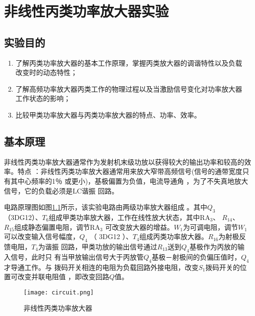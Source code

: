 \documentclass[../main]{subfiles}
\begin{document}
\chapter{非线性丙类功率放大器实验}%
\label{cha:非线性丙类功率放大器实验}

\section{实验目的}%
\label{sec:\arabic{chapter}实验目的}

\begin{enumerate}

	\item 了解丙类功率放大器的基本工作原理，掌握丙类放大器的调谐特性以及负载
		改变时的动态特性；

	\item 了解高频功率放大器丙类工作的物理过程以及当激励信号变化对功率放大器
		工作状态的影响；

	\item 比较甲类功率放大器与丙类功率放大器的特点、功率、效率。

\end{enumerate}

\section{基本原理}%
\label{sec:\arabic{chapter}基本原理}

非线性丙类功率放大器通常作为发射机末级功放以获得较大的输出功率和较高的效率。特点
：非线性丙类功率放大器通常用来放大窄带高频信号(信号的通带宽度只有其中心频率的1％
或更小)，基极偏置为负值，电流导通角 ，为了不失真地放大信号，它的负载必须是LC谐振
回路。

电路原理图如图\ref{fig:非线性丙类功率放大器}所示，该实验电路由两级功率放大器组成
。其中$ Q_3 $（3DG12）、$ T_6 $组成甲类功率放大器，工作在线性放大状态，其中$
\mathrm{RA}_3 $、 $ R_{14} $、 $ R_{15} $组成静态偏置电阻，调节$ \mathrm{RA}_3 $
可改变放大器的增益。$ W_1 $为可调电阻，调节$ W_1 $可以改变输入信号幅度，$ Q_4 $
（ 3DG12 ）、$ T_4 $组成丙类功率放大器。$ R_{16} $为射极反馈电阻，$ T_4 $为谐振
回路，甲类功放的输出信号通过$ R_{13} $送到$ Q_4 $基极作为丙放的输入信号，此时只
有当甲放输出信号大于丙放管$ Q_4 $基极－射极间的负偏压值时，$ Q_4 $才导通工作。与
拨码开关相连的电阻为负载回路外接电阻，改变$ S_1 $拨码开关的位置可改变并联电阻值
，即改变回路$ Q $值。

\begin{figure}[htbp]
	\centering
	\texttt{[image: circuit.png]}
	\caption{非线性丙类功率放大器}
	\label{fig:非线性丙类功率放大器}
\end{figure}
\end{document}
